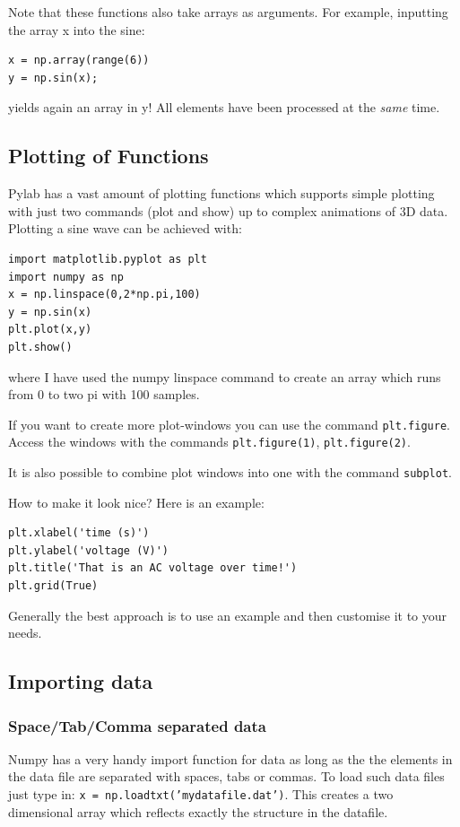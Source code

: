 \documentclass[12pt,a4paper]{article}
\begin{document}
Note that these functions also take arrays as arguments. For example,
inputting the array x into the sine:
\begin{verbatim}
x = np.array(range(6))
y = np.sin(x);
\end{verbatim}
yields again an array in y! All elements have been processed at the 
\emph{same} time.


\subsection{Plotting of Functions}
Pylab has a vast amount of plotting functions which supports simple plotting
with just two commands (plot and show) up to complex animations of 3D data.
Plotting a sine wave can be achieved with:
\begin{verbatim} 
import matplotlib.pyplot as plt
import numpy as np
x = np.linspace(0,2*np.pi,100)
y = np.sin(x)
plt.plot(x,y)
plt.show()
\end{verbatim}
where I have used the numpy linspace command to create an array which
runs from 0 to two pi with 100 samples.

If you want to create more plot-windows you can use the command
\texttt{plt.figure}. Access the windows with the commands \texttt{plt.figure(1)},
\texttt{plt.figure(2)}.

It is also possible to combine plot windows into one with the
command \texttt{subplot}.

How to make it look nice? Here is an example:
\begin{verbatim}
plt.xlabel('time (s)')
plt.ylabel('voltage (V)')
plt.title('That is an AC voltage over time!')
plt.grid(True)
\end{verbatim}

Generally the best approach is to use an example and then customise it to your needs.




\subsection{Importing data}

\subsubsection{Space/Tab/Comma separated data}
Numpy has a very handy import function for data as long as the the
elements in the data file are separated with spaces, tabs or
commas. To load such data files just type in: \texttt{x =
  np.loadtxt('mydatafile.dat')}. This creates a two dimensional array
which reflects exactly the structure in the datafile.
\end{document}

